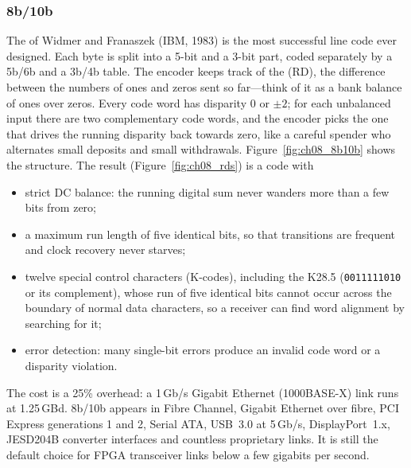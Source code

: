 \subsubsection{8b/10b}
The  of Widmer and Franaszek (IBM, 1983) is the most successful line code
ever designed. Each byte is split into a 5-bit and a 3-bit part, coded separately by a 5b/6b
and a 3b/4b table. The encoder keeps track of the  (RD), the
difference between the numbers of ones and zeros sent so far---think of it as a bank balance
of ones over zeros. Every code word has disparity 0 or $\pm2$; for each unbalanced input there
are two complementary code words, and the encoder picks the one that drives the running
disparity back towards zero, like a careful spender who alternates small deposits and small
withdrawals. Figure~\ref{fig:ch08_8b10b} shows the structure. The result (Figure~\ref{fig:ch08_rds}) is a
code with
\begin{itemize}
\item strict DC balance: the running digital sum never wanders more than a few bits from zero;
\item a maximum run length of five identical bits, so that transitions are frequent and
clock recovery never starves;
\item twelve special control characters (K-codes), including the 
K28.5 (\texttt{0011111010} or its complement), whose run of five identical bits cannot
occur across the boundary of normal data characters, so a receiver can find word
alignment by searching for it;
\item error detection: many single-bit errors produce an invalid code word or a disparity
violation.
\end{itemize}
The cost is a 25\% overhead: a 1\,Gb/s Gigabit Ethernet (1000BASE-X) link runs at 1.25\,GBd.
8b/10b appears in Fibre Channel, Gigabit Ethernet over fibre, PCI Express generations 1 and
2, Serial ATA, USB~3.0 at 5\,Gb/s, DisplayPort~1.x, JESD204B converter interfaces and
countless proprietary links. It is still the default choice for FPGA transceiver links
below a few gigabits per second.


